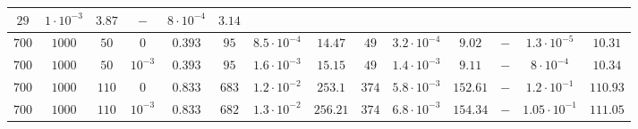 \documentclass[twocolumn]{svjour3}
\begin{document}
\begin{table*} [!htp]
\begin{center}
\begin{tabular}{|c|c|c|c|c|c|c|c|c|c|c|c|c|c}
\multicolumn{1}{|c}{$29$} & \multicolumn{1}{c}{$1\cdot 10^{-3}$} & \multicolumn{1}{c|}{$3.87$} &
\multicolumn{1}{|c}{$-$} & \multicolumn{1}{c}{$8\cdot 10^{-4}$} & \multicolumn{1}{c}{$3.14$} \\
\hline
\multicolumn{1}{c}{$700$} & \multicolumn{1}{c}{$1000$} & \multicolumn{1}{c}{$50$} & \multicolumn{1}{c|}{$0$} & $0.393$ & 
\multicolumn{1}{|c}{$95$} & \multicolumn{1}{c}{$8.5\cdot 10^{-4}$} & \multicolumn{1}{c|}{$14.47$} &
\multicolumn{1}{|c}{$49$} & \multicolumn{1}{c}{$3.2\cdot 10^{-4}$} & \multicolumn{1}{c|}{$9.02$} &
\multicolumn{1}{|c}{$-$} & \multicolumn{1}{c}{$1.3\cdot 10^{-5}$} & \multicolumn{1}{c}{$10.31$} \\
\hline
\multicolumn{1}{c}{$700$} & \multicolumn{1}{c}{$1000$} & \multicolumn{1}{c}{$50$} & \multicolumn{1}{c|}{$10^{-3}$} & $0.393$ & 
\multicolumn{1}{|c}{$95$} & \multicolumn{1}{c}{$1.6\cdot 10^{-3}$} & \multicolumn{1}{c|}{$15.15$} &
\multicolumn{1}{|c}{$49$} & \multicolumn{1}{c}{$1.4\cdot 10^{-3}$} & \multicolumn{1}{c|}{$9.11$} &
\multicolumn{1}{|c}{$-$} & \multicolumn{1}{c}{$8\cdot 10^{-4}$} & \multicolumn{1}{c}{$10.34$} \\
\hline
\multicolumn{1}{c}{$700$} & \multicolumn{1}{c}{$1000$} & \multicolumn{1}{c}{$110$} & \multicolumn{1}{c|}{$0$} & $0.833$ & 
\multicolumn{1}{|c}{$683$} & \multicolumn{1}{c}{$1.2\cdot 10^{-2}$} & \multicolumn{1}{c|}{$253.1$} &
\multicolumn{1}{|c}{$374$} & \multicolumn{1}{c}{$5.8\cdot 10^{-3}$} & \multicolumn{1}{c|}{$152.61$} &
\multicolumn{1}{|c}{$-$} & \multicolumn{1}{c}{$1.2 \cdot 10^{-1}$} & \multicolumn{1}{c}{$110.93$} \\
\hline
\multicolumn{1}{c}{$700$} & \multicolumn{1}{c}{$1000$} & \multicolumn{1}{c}{$110$} & \multicolumn{1}{c|}{$10^{-3}$} & $0.833$ & 
\multicolumn{1}{|c}{$682$} & \multicolumn{1}{c}{$1.3\cdot 10^{-2}$} & \multicolumn{1}{c|}{$256.21$} &
\multicolumn{1}{|c}{$374$} & \multicolumn{1}{c}{$6.8\cdot 10^{-3}$} & \multicolumn{1}{c|}{$154.34$} &
\multicolumn{1}{|c}{$-$} & \multicolumn{1}{c}{$1.05 \cdot 10^{-1}$} & \multicolumn{1}{c}{$111.05$} \\
\hline  \hline \hline


\end{tabular}
\end{center}
\end{table*}
\end{document}
